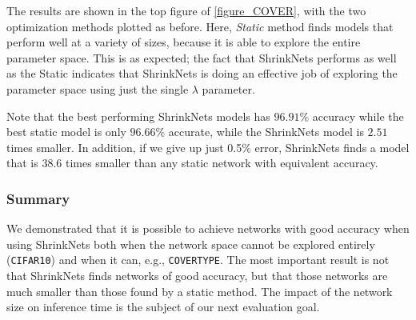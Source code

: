 The results are shown in the top figure of \cref{figure_COVER}, with the two
optimization methods plotted as before. Here, {\it Static} method finds models
that perform well at a variety of sizes, because it is able to explore the
entire parameter space.  This is as expected;  the fact that ShrinkNets performs
as well as the Static indicates that ShrinkNets is doing an effective job of
exploring the parameter space using just the single $\lambda$ parameter.

Note that the best performing ShrinkNets models has $96.91\%$ accuracy while the
best static model is only $96.66\%$ accurate, while the ShrinkNets model is $2.51$
times smaller. In addition, if we give up just 0.5\% error, ShrinkNets finds a
model that is 38.6 times smaller than any static network with equivalent accuracy.


\subsubsection{Summary}

We  demonstrated that it is possible to achieve networks with good accuracy
when using ShrinkNets both when the network space cannot be explored entirely
(\texttt{CIFAR10}) and when it can, e.g., \texttt{COVERTYPE}. The most important
result is not that ShrinkNets finds networks of good accuracy, but that those
networks are much smaller than those found by a static method. The impact of the
network size on inference time is the subject of our next evaluation goal.

%
%
%

